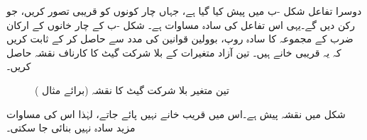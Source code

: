 دوسرا تفاعل شکل -ب میں پیش کیا گیا ہے، جہاں چار کونوں کو قریبی تصور کریں، جو رکن  دیں 
گے۔یہی اس تفاعل کی سادہ مساوات  ہے۔
شکل -ب کے چار خانوں کے ارکان ضرب کے مجموعہ کا سادہ روپ، بوولین قوانین کی مدد سے حاصل کر کے ثابت کریں کہ یہ قریبی خانے ہیں۔
تین آزاد متغیرات کے بلا شرکت گیٹ کا کارناف نقشہ حاصل کریں۔

\begin{figure}
\centering
\begin{subfigure}{0.45\textwidth}
\centering
{}
\end{subfigure}\hfill
\begin{subfigure}{0.45\textwidth}
\centering
{}
\end{subfigure}
\caption{تین متغیر بلا شرکت گیٹ کا نقشہ (برائے مثال )}
\label{شکل_بوولین_تین_بلاشرکت}
\end{figure}
\quad
شکل  میں نقشہ پیش ہے۔اس میں قریب خانے نہیں پائے جاتے، لہٰذا اس کی مساوات مزید سادہ نہیں بنائی جا سکتی۔ 


